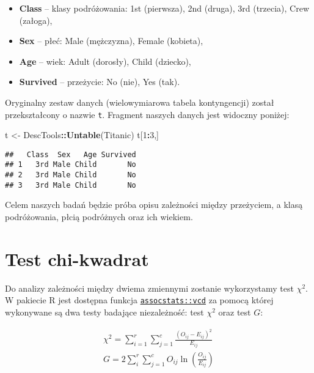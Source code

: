 \documentclass[polish,]{book}
\newenvironment{Shaded}{\begin{snugshade}}{\end{snugshade}}
\newcommand{\DecValTok}[1]{\textcolor[rgb]{0.00,0.00,0.81}{#1}}
\newcommand{\KeywordTok}[1]{\textcolor[rgb]{0.13,0.29,0.53}{\textbf{#1}}}
\newcommand{\NormalTok}[1]{#1}
\newcommand{\OperatorTok}[1]{\textcolor[rgb]{0.81,0.36,0.00}{\textbf{#1}}}
\newcommand{\StringTok}[1]{\textcolor[rgb]{0.31,0.60,0.02}{#1}}
\begin{document}
\begin{itemize}
\item
  \textbf{Class} -- klasy podróżowania: 1st (pierwsza), 2nd (druga), 3rd (trzecia), Crew
  (załoga),
\item
  \textbf{Sex} -- płeć: Male (mężczyzna), Female (kobieta),
\item
  \textbf{Age} -- wiek: Adult (dorosły), Child (dziecko),
\item
  \textbf{Survived} -- przeżycie: No (nie), Yes (tak).
\end{itemize}

Oryginalny zestaw danych (wielowymiarowa tabela kontyngencji) został przekształcony o nazwie \texttt{t}. Fragment naszych
danych jest widoczny poniżej:

\begin{Shaded}
\begin{Highlighting}[]
\NormalTok{t <-}\StringTok{ }\NormalTok{DescTools}\OperatorTok{::}\KeywordTok{Untable}\NormalTok{(Titanic)}
\NormalTok{t[}\DecValTok{1}\OperatorTok{:}\DecValTok{3}\NormalTok{,]}
\end{Highlighting}
\end{Shaded}

\begin{verbatim}
##   Class  Sex   Age Survived
## 1   3rd Male Child       No
## 2   3rd Male Child       No
## 3   3rd Male Child       No
\end{verbatim}

Celem naszych badań będzie próba opisu zależności między przeżyciem, a klasą
podróżowania, płcią podróżnych oraz ich wiekiem.

\hypertarget{part_82}{%
\section{Test chi-kwadrat}\label{part_82}}

Do analizy zależności między dwiema zmiennymi zostanie wykorzystamy test \(\chi^2\). W
pakiecie R jest dostępna funkcja \href{}{\texttt{assocstats::vcd}} za pomocą której wykonywane
są dwa testy badające niezależność: test \(\chi^2\) oraz test \(G\):

\begin{subequations}
\begin{align}
\chi^2=\sum_{i=1}^{r} \sum_{j=1}^{c}\frac{(O_{ij}-E_{ij})^2}{E_{ij}} \label{eq:wz81}\\
G=2\sum_{i}^{r}\sum_{j=1}^{c} O_{ij}\ln\left(\frac{O_{ij}}{E_{ij}}\right) \label{eq:wz82}
\end{align}
\end{subequations}
\end{document}
